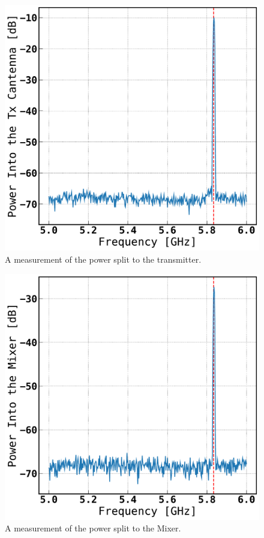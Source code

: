 \documentclass[reprint, aps, prl]{revtex4-1}
\begin{document}
\begin{figure}[!htbp]
    \centering
    \includegraphics[scale=0.35]{Tx_Power.pdf}
    \caption{A measurement of the power split to the transmitter.}
    \label{fig:txpowersplit}
\end{figure}

\begin{figure}[!htbp]
    \centering
    \includegraphics[scale=0.35]{Mixer_Power.pdf}
    \caption{A measurement of the power split to the Mixer.}
    \label{fig:mixpowersplit}
\end{figure}
\end{document}

